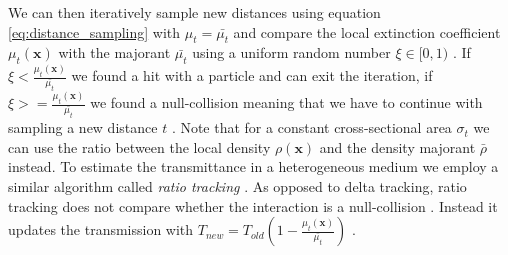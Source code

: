 We can then iteratively sample new distances using equation \ref{eq:distance_sampling} with $\mu_t=\bar{\mu_t}$ and compare the local extinction coefficient $\mu_t(\boldsymbol{x})$ with the majorant $\bar{\mu_t}$ using a uniform random number $\xi\in[0,1)$ \cite{spectral_and_decomposition_tracking}.
If $\xi<\frac{\mu_t(\boldsymbol{x})}{\bar{\mu_t}}$ we found a hit with a particle and can exit the iteration, if $\xi>=\frac{\mu_t(\boldsymbol{x})}{\bar{\mu_t}}$ we found a null-collision meaning that we have to continue with sampling a new distance $t$ \cite{spectral_and_decomposition_tracking}.
Note that for a constant cross-sectional area $\sigma_t$ we can use the ratio between the local density $\rho(\boldsymbol{x})$ and the density majorant $\bar{\rho}$ instead.
To estimate the transmittance in a heterogeneous medium we employ a similar algorithm called \textit{ratio tracking} \cite{novak_ratio_tracking}.
As opposed to delta tracking, ratio tracking does not compare whether the interaction is a null-collision \cite{novak_ratio_tracking}.
Instead it updates the transmission with $T_{new} = T_{old}(1 - \frac{\mu_t(\boldsymbol{x})}{\bar{\mu_t}})$ \cite{novak_ratio_tracking}.

